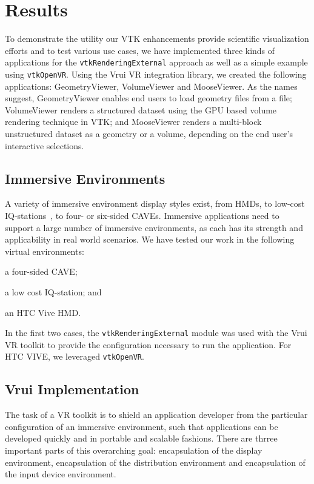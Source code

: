 \section{Results}

To demonstrate the utility our VTK enhancements provide scientific
visualization efforts and to test various use cases, we have implemented three kinds of
applications for the \texttt{vtkRenderingExternal} approach as well as
a simple example using \texttt{vtkOpenVR}.
Using the Vrui VR integration library, we created the following applications:
GeometryViewer, VolumeViewer and MooseViewer.
As the names suggest, GeometryViewer enables end users to load geometry files from a file; VolumeViewer renders a structured dataset using the GPU based volume rendering technique in VTK; and MooseViewer renders a multi-block unstructured dataset as a geometry or a volume, depending on the end user's interactive selections.

\subsection{Immersive Environments}

A variety of immersive environment display styles exist, from HMDs, to low-cost IQ-stations~\cite{Sherman:2010}, to four- or six-sided CAVEs. Immersive applications need to support a large number of immersive environments, as each has its strength and applicability in real world scenarios. We have tested our work in the following virtual environments: 

\begin{compactitem}
\item a four-sided CAVE;
\item a low cost IQ-station; and 
\item an HTC Vive HMD.
\end{compactitem}

In the first two cases, the \texttt{vtkRenderingExternal} module was used with the Vrui VR toolkit to provide the configuration necessary to run the application. For  HTC VIVE, we leveraged \texttt{vtkOpenVR}. 

\subsection{Vrui Implementation}

The task of a VR toolkit is to shield an application developer from the particular configuration of an immersive environment, such that applications can be developed quickly and in portable and scalable fashions. There are thrree important parts of this overarching goal: encapsulation of the display environment, encapsulation of the distribution environment and encapsulation of the input device environment.

